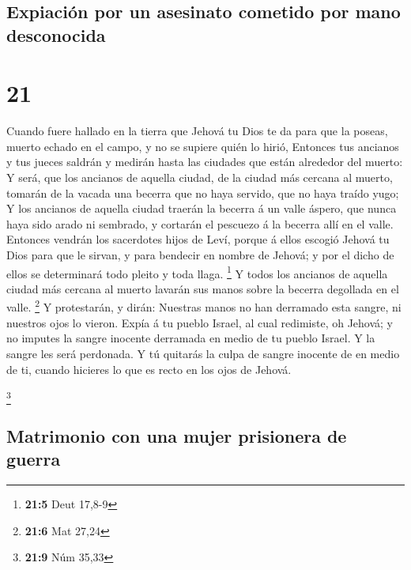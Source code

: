 \hypertarget{expiaciuxf3n-por-un-asesinato-cometido-por-mano-desconocida}{%
\subsection{Expiación por un asesinato cometido por mano
desconocida}\label{expiaciuxf3n-por-un-asesinato-cometido-por-mano-desconocida}}

\hypertarget{section-20}{%
\section{21}\label{section-20}}

 Cuando fuere hallado en la tierra que Jehová tu Dios te
da para que la poseas, muerto echado en el campo, y no se supiere quién
lo hirió,  Entonces tus ancianos y tus jueces saldrán y
medirán hasta las ciudades que están alrededor del muerto:
 Y será, que los ancianos de aquella ciudad, de la ciudad
más cercana al muerto, tomarán de la vacada una becerra que no haya
servido, que no haya traído yugo;  Y los ancianos de
aquella ciudad traerán la becerra á un valle áspero, que nunca haya sido
arado ni sembrado, y cortarán el pescuezo á la becerra allí en el valle.
 Entonces vendrán los sacerdotes hijos de Leví, porque á
ellos escogió Jehová tu Dios para que le sirvan, y para bendecir en
nombre de Jehová; y por el dicho de ellos se determinará todo pleito y
toda llaga. \footnote{\textbf{21:5} Deut 17,8-9}  Y todos
los ancianos de aquella ciudad más cercana al muerto lavarán sus manos
sobre la becerra degollada en el valle. \footnote{\textbf{21:6} Mat
  27,24}  Y protestarán, y dirán: Nuestras manos no han
derramado esta sangre, ni nuestros ojos lo vieron.  Expía
á tu pueblo Israel, al cual redimiste, oh Jehová; y no imputes la sangre
inocente derramada en medio de tu pueblo Israel. Y la sangre les será
perdonada.  Y tú quitarás la culpa de sangre inocente de
en medio de ti, cuando hicieres lo que es recto en los ojos de Jehová.

\footnote{\textbf{21:9} Núm 35,33}

\hypertarget{matrimonio-con-una-mujer-prisionera-de-guerra}{%
\subsection{Matrimonio con una mujer prisionera de
guerra}\label{matrimonio-con-una-mujer-prisionera-de-guerra}}

